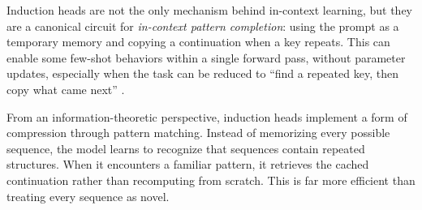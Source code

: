 Induction heads are not the only mechanism behind in-context learning, but they are a canonical circuit for \emph{in-context pattern completion}: using the prompt as a temporary memory and copying a continuation when a key repeats. This can enable some few-shot behaviors within a single forward pass, without parameter updates, especially when the task can be reduced to ``find a repeated key, then copy what came next'' \citep{elhage2021circuits,olsson2022icl}.

From an information-theoretic perspective, induction heads implement a form of compression through pattern matching. Instead of memorizing every possible sequence, the model learns to recognize that sequences contain repeated structures. When it encounters a familiar pattern, it retrieves the cached continuation rather than recomputing from scratch. This is far more efficient than treating every sequence as novel.

\vspace{1.5em}

